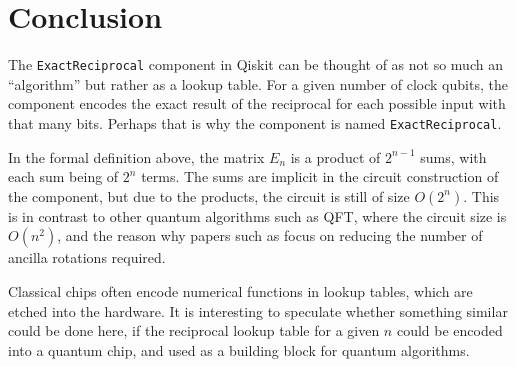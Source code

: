 \documentclass[12pt]{extarticle}
\begin{document}

\section{Conclusion}

The \texttt{ExactReciprocal} component in Qiskit can be thought of as not so much an ``algorithm'' but rather as a lookup table.
For a given number of clock qubits, the component encodes the exact result of the reciprocal for each possible input with that many bits.
Perhaps that is why the component is named \texttt{ExactReciprocal}.

In the formal definition above, the matrix $E_n$ is a product of $2^{n-1}$ sums, with each sum being of $2^n$ terms.
The sums are implicit in the circuit construction of the component, but due to the products, the circuit is still of size $O(2^n)$.
This is in contrast to other quantum algorithms such as QFT, where the circuit size is $O(n^2)$,
and the reason why papers such as \cite{ssrn_enhanced_hhl} focus on reducing the number of ancilla rotations required.

Classical chips often encode numerical functions in lookup tables, which are etched into the hardware.
It is interesting to speculate whether something similar could be done here, if the reciprocal lookup table for a given $n$
could be encoded into a quantum chip, and used as a building block for quantum algorithms.

\printbibliography
{}
\end{document}
